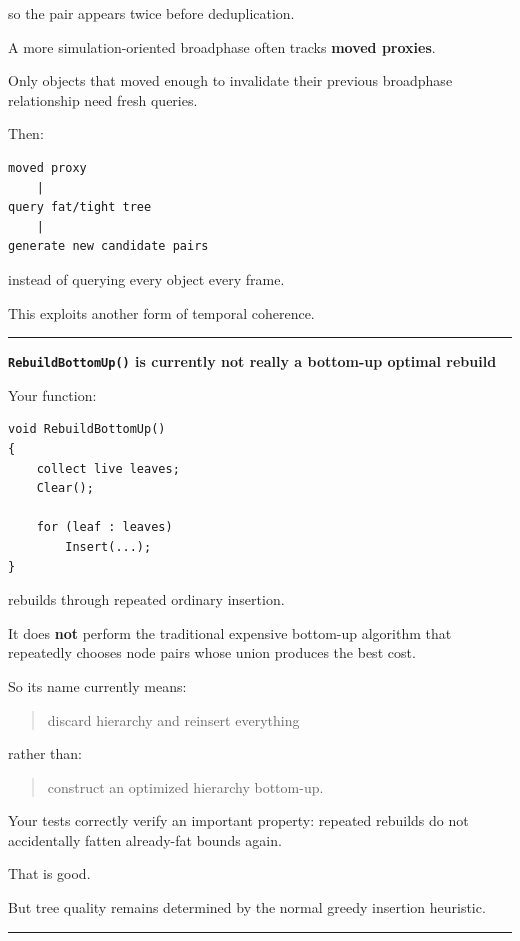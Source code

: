 so the pair appears twice before deduplication.

A more simulation-oriented broadphase often tracks \textbf{moved proxies}.

Only objects that moved enough to invalidate their previous broadphase relationship need fresh queries.

Then:

\begin{verbatim}
moved proxy
    |
query fat/tight tree
    |
generate new candidate pairs
\end{verbatim}

instead of querying every object every frame.

This exploits another form of temporal coherence.

\begin{center}\rule{0.5\linewidth}{0.5pt}\end{center}

\textbf{\texttt{RebuildBottomUp()} is currently not really a bottom-up optimal rebuild}

Your function:

\begin{verbatim}
void RebuildBottomUp()
{
    collect live leaves;
    Clear();

    for (leaf : leaves)
        Insert(...);
}
\end{verbatim}

rebuilds through repeated ordinary insertion.

It does \textbf{not} perform the traditional expensive bottom-up algorithm that repeatedly chooses node pairs whose union produces the best cost.

So its name currently means:

\begin{quote}
discard hierarchy and reinsert everything
\end{quote}

rather than:

\begin{quote}
construct an optimized hierarchy bottom-up.
\end{quote}

Your tests correctly verify an important property: repeated rebuilds do not accidentally fatten already-fat bounds again.

That is good.

But tree quality remains determined by the normal greedy insertion heuristic.

\begin{center}\rule{0.5\linewidth}{0.5pt}\end{center}

